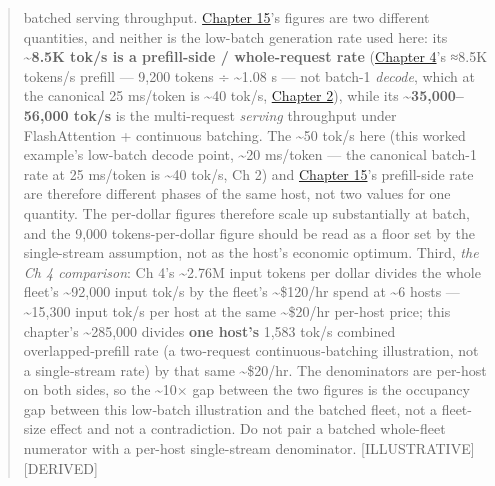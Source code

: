 \begin{quote}
batched serving throughput. \hyperref[chap:15]{Chapter 15}'s figures are two different
quantities, and neither is the low-batch generation rate used here: its
\textbf{\textasciitilde8.5K tok/s is a prefill-side / whole-request
rate} (\hyperref[chap:4]{Chapter 4}'s ≈8.5K tokens/s prefill --- 9,200 tokens ÷
\textasciitilde1.08 s --- not batch-1 \emph{decode}, which at the
canonical 25 ms/token is \textasciitilde40 tok/s, \hyperref[chap:2]{Chapter 2}), while its
\textbf{\textasciitilde35,000--56,000 tok/s} is the multi-request
\emph{serving} throughput under FlashAttention + continuous batching.
The \textasciitilde50 tok/s here (this worked example's low-batch decode
point, \textasciitilde20 ms/token --- the canonical batch-1 rate at 25
ms/token is \textasciitilde40 tok/s, Ch 2) and \hyperref[chap:15]{Chapter 15}'s prefill-side
rate are therefore different phases of the same host, not two values for
one quantity. The per-dollar figures therefore scale up substantially at
batch, and the 9,000 tokens-per-dollar figure should be read as a floor
set by the single-stream assumption, not as the host's economic optimum.
Third, \emph{the Ch 4 comparison}: Ch 4's \textasciitilde2.76M input
tokens per dollar divides the whole fleet's \textasciitilde92,000 input
tok/s by the fleet's \textasciitilde\$120/hr spend at \textasciitilde6
hosts --- \textasciitilde15,300 input tok/s per host at the same
\textasciitilde\$20/hr per-host price; this chapter's
\textasciitilde285,000 divides \textbf{one host's} 1,583 tok/s combined
overlapped‑prefill rate (a two‑request continuous‑batching illustration,
not a single‑stream rate) by that same \textasciitilde\$20/hr. The
denominators are per-host on both sides, so the \textasciitilde10× gap
between the two figures is the occupancy gap between this low‑batch
illustration and the batched fleet, not a fleet-size effect and not a
contradiction. Do not pair a batched whole-fleet numerator with a
per-host single-stream denominator. \mbox{{[}ILLUSTRATIVE{]}}\hspace{0pt}\mbox{{[}DERIVED{]}}
\end{quote}

